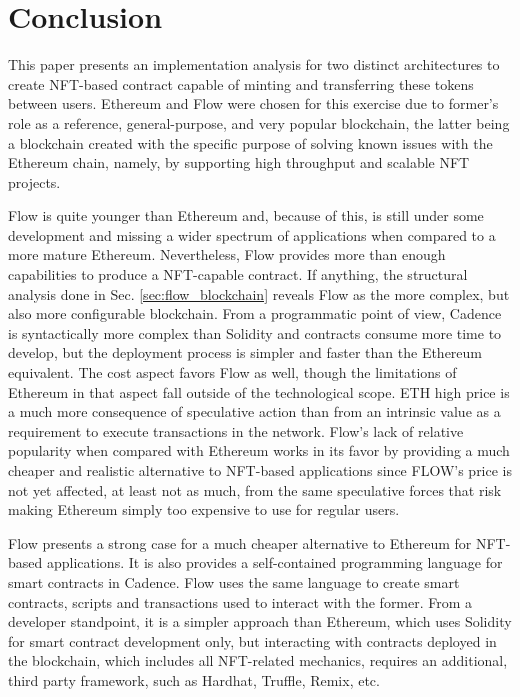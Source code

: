 \documentclass[../NFTComp_IEEE.tex]{subfiles}
\begin{document}
\section{Conclusion}
\label{sec:conclusion}
This paper presents an implementation analysis for two distinct architectures to create NFT-based contract capable of minting and transferring these tokens between users. Ethereum and Flow were chosen for this exercise due to former's role as a reference, general-purpose, and very popular blockchain, the latter being a blockchain created with the specific purpose of solving known issues with the Ethereum chain, namely, by supporting high throughput and scalable NFT projects.
\par
Flow is quite younger than Ethereum and, because of this, is still under some development and missing a wider spectrum of applications when compared to a more mature Ethereum. Nevertheless, Flow provides more than enough capabilities to produce a NFT-capable contract. If anything, the structural analysis done in Sec. \ref{sec:flow_blockchain} reveals Flow as the more complex, but also more configurable blockchain. From a programmatic point of view, Cadence is syntactically more complex than Solidity and contracts consume more time to develop, but the deployment process is simpler and faster than the Ethereum equivalent. The cost aspect favors Flow as well, though the limitations of Ethereum in that aspect fall outside of the technological scope. ETH high price is a much more consequence of speculative action than from an intrinsic value as a requirement to execute transactions in the network. Flow's lack of relative popularity when compared with Ethereum works in its favor by providing a much cheaper and realistic alternative to NFT-based applications since FLOW's price is not yet affected, at least not as much, from the same speculative forces that risk making Ethereum simply too expensive to use for regular users.
\par
Flow presents a strong case for a much cheaper alternative to Ethereum for NFT-based applications. It is also provides a self-contained programming language for smart contracts in Cadence. Flow uses the same language to create smart contracts, scripts and transactions used to interact with the former. From a developer standpoint, it is a simpler approach than Ethereum, which uses Solidity for smart contract development only, but interacting with contracts deployed in the blockchain, which includes all NFT-related mechanics, requires an additional, third party framework, such as Hardhat, Truffle, Remix, etc.
\end{document}
